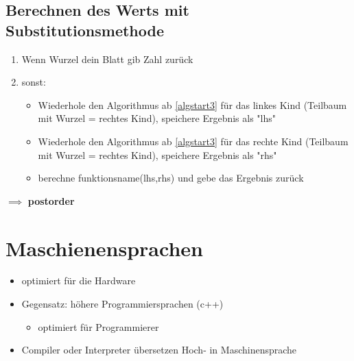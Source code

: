 \documentclass[a4paper]{scrartcl}
\begin{document}
\subsection{Berechnen des Werts mit Substitutionsmethode}
\label{sec-4-6}
\begin{enumerate}
\item \label{algstart3} Wenn Wurzel dein Blatt gib Zahl zurück
\item sonst:
\begin{itemize}
\item Wiederhole den Algorithmus ab \ref{algstart3} für das linkes Kind (Teilbaum mit Wurzel = rechtes Kind), speichere Ergebnis als "lhs"
\item Wiederhole den Algorithmus ab \ref{algstart3} für das rechte Kind (Teilbaum mit Wurzel = rechtes Kind), speichere Ergebnis als "rhs"
\item berechne funktionsname(lhs,rhs) und gebe das Ergebnis zurück
\end{itemize}
\end{enumerate}
$\implies$ \textbf{postorder}
\section{Maschienensprachen}
\label{sec-5}
\begin{itemize}
\item optimiert für die Hardware
\item Gegensatz: höhere Programmiersprachen (c++)
\begin{itemize}
\item optimiert für Programmierer
\end{itemize}
\item Compiler oder Interpreter übersetzen Hoch- in Maschinensprache
\end{itemize}
\end{document}
